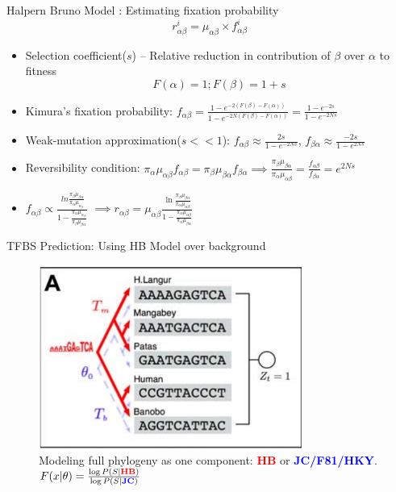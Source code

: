 \documentclass[10pt]{beamer}
\newcommand{\red}[1]{\textcolor{red}{#1}}
\newcommand{\blue}[1]{\textcolor{blue}{#1}}
\begin{document}
\begin{frame}[fragile]{Halpern Bruno Model : Estimating fixation probability}
$$
{r_{\alpha\beta}^{i}}  =   {\mu_{\alpha\beta}} \times  {f_{\alpha\beta}^i }
$$
\begin{itemize}[<+- | alert@+>]
\item Selection coefficient($s$) -- Relative reduction in contribution of $\beta$ over $\alpha$ to fitness
$$F(\alpha)=1; F(\beta) = 1+s$$
\item Kimura's fixation probability: $f_{\alpha\beta} = \frac{1-e^{-2(F(\beta) - F(\alpha))}}{1-e^{-2N(F(\beta) - F(\alpha))}} = \frac{1-e^{-2s}}{1-e^{-2Ns}}$
\item Weak-mutation approximation($s<<1$): $f_{\alpha\beta} \approx \frac{2s}{1-e^{-2Ns}}$, $f_{\beta\alpha} \approx \frac{-2s}{1-e^{2Ns}}$
\item Reversibility condition: $\pi_\alpha \mu_{\alpha\beta}f_{\alpha\beta} = \pi_\beta \mu_{\beta\alpha} f_{\beta\alpha} \implies \frac{\pi_\beta \mu_{\beta\alpha}}{\pi_\alpha \mu_{\alpha\beta}} = \frac{f_{\alpha\beta}}{f_{\beta\alpha}} = e^{2Ns} $\\
\item $f_{\alpha\beta} \propto \frac{\ ln{\frac{\pi_\beta \mu_{\beta\alpha}  }{ \pi_\alpha \mu_{\alpha_\beta} } }} 
{1- \frac{ \pi_\alpha \mu_{\alpha_\beta} } {\pi_\beta \mu_{\beta\alpha} } } $  $\implies r_{\alpha\beta} = \mu_{\alpha\beta} \frac{\ln{\frac{\pi_\beta \mu_{\beta\alpha}}{\pi_\alpha \mu_{\alpha\beta}}}}{1-\frac{\pi_\alpha \mu_{\alpha\beta}  }{\pi_\alpha \mu_{\beta\alpha}  } } $
\end{itemize}
\end{frame}


\begin{frame}[fragile]{TFBS Prediction: Using HB Model over background}
	\begin{figure}
		\includegraphics[width=0.77\textwidth]{images/monkey-model.png}
        \caption{Modeling full phylogeny as one component: \red{\textbf{{HB}}} or \blue{\textbf{JC/F81/HKY}}. $F(x| \theta) = \frac{\log P(S| \red{\textbf{{HB}}} ) }{ \log P(S|\blue{\textbf{JC}}) }$ }
	\end{figure}
\end{frame}
\end{document}
